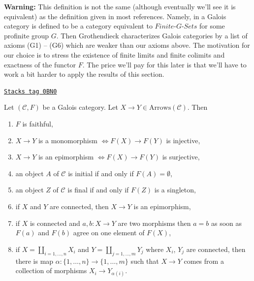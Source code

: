 {\bf Warning:} This definition is not the same (although eventually we'll
see it is equivalent) as the definition given in most references.
Namely, in \cite[Expos\'e V, Definition 5.1]{SGA1} a Galois category is
defined to be a category equivalent to $\textit{Finite-}G\textit{-Sets}$
for some profinite group $G$. Then Grothendieck characterizes
Galois categories by a list of axioms (G1) -- (G6) which are weaker
than our axioms above. The motivation for our choice is to stress the
existence of finite limits and finite colimits and exactness of the
functor $F$. The price we'll pay for this later is that we'll have
to work a bit harder to apply the results of this section.

\begin{lemma}
\label{pione-lemma-epi-mono}
\href{https://stacks.math.columbia.edu/tag/0BN0}{\texttt{Stacks tag 0BN0}}

Let $(\mathcal{C}, F)$ be a Galois category. Let
$X \to Y \in \text{Arrows}(\mathcal{C})$. Then
\begin{enumerate}
\item $F$ is faithful,
\item $X \to Y$ is a monomorphism
$\Leftrightarrow F(X) \to F(Y)$ is injective,
\item $X \to Y$ is an epimorphism
$\Leftrightarrow F(X) \to F(Y)$ is surjective,
\item an object $A$ of $\mathcal{C}$ is initial if and only if
$F(A) = \emptyset$,
\item an object $Z$ of $\mathcal{C}$ is final if and only if
$F(Z)$ is a singleton,
\item if $X$ and $Y$ are connected, then $X \to Y$ is an epimorphism,
\item
\label{pione-item-one-element}
if $X$ is connected and $a, b : X \to Y$ are two morphisms
then $a = b$ as soon as $F(a)$ and $F(b)$ agree on one element of $F(X)$,
\item if $X = \coprod_{i = 1, \ldots, n} X_i$ and
$Y = \coprod_{j = 1, \ldots, m} Y_j$ where $X_i$, $Y_j$ are connected,
then there is map $\alpha : \{1, \ldots, n\} \to \{1, \ldots, m\}$
such that $X \to Y$ comes from a collection of morphisms
$X_i \to Y_{\alpha(i)}$.
\end{enumerate}
\end{lemma}

